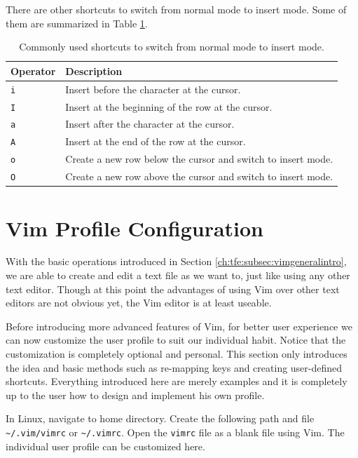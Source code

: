 There are other shortcuts to switch from normal mode to insert mode. Some of them are summarized in Table \ref{ch:tfe:tab:switchtoinsert}.

\begin{table}
  \centering \caption{Commonly used shortcuts to switch from normal mode to insert mode.}\label{ch:tfe:tab:switchtoinsert}
  \begin{tabularx}{\textwidth}{lX}
    \hline
    Operator & Description \\ \hline
    \verb|i| & Insert before the character at the cursor. \\ 
    \verb|I| & Insert at the beginning of the row at the cursor. \\ 
    \verb|a| & Insert after the character at the cursor. \\ 
    \verb|A| & Insert at the end of the row at the cursor. \\ 
    \verb|o| & Create a new row below the cursor and switch to insert mode. \\ 
    \verb|O| & Create a new row above the cursor and switch to insert mode. \\
    \hline
  \end{tabularx}
\end{table}

\section{Vim Profile Configuration}

With the basic operations introduced in Section \ref{ch:tfe:subsec:vimgeneralintro}, we are able to create and edit a text file as we want to, just like using any other text editor. Though at this point the advantages of using Vim over other text editors are not obvious yet, the Vim editor is at least useable.

Before introducing more advanced features of Vim, for better user experience we can now customize the user profile to suit our individual habit. Notice that the customization is completely optional and personal. This section only introduces the idea and basic methods such as re-mapping keys and creating user-defined shortcuts. Everything introduced here are merely examples and it is completely up to the user how to design and implement his own profile.

In Linux, navigate to home directory. Create the following path and file \verb|~/.vim/vimrc| or \verb|~/.vimrc|. Open the \verb|vimrc| file as a blank file using Vim. The individual user profile can be customized here.

